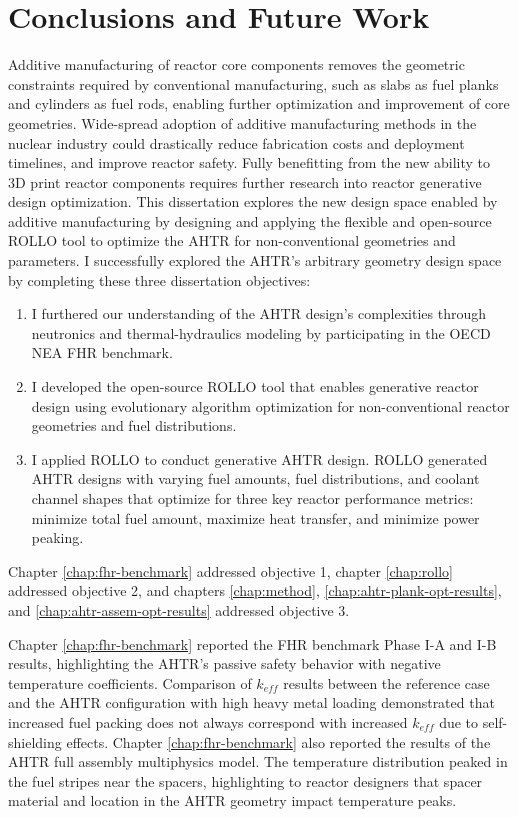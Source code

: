 \chapter{Conclusions and Future Work}
\glsresetall
\label{chap:concl}

Additive manufacturing of reactor core components removes the geometric constraints
required by conventional manufacturing, such as slabs as fuel planks and cylinders 
as fuel rods, enabling further optimization and improvement of core geometries. 
Wide-spread adoption of additive manufacturing methods in the nuclear industry
could drastically reduce fabrication costs and deployment timelines, and improve 
reactor safety. 
Fully benefitting from the new ability to 3D print reactor components requires further 
research into reactor generative design optimization. 
This dissertation explores the new design space enabled by additive manufacturing 
by designing and applying the flexible and open-source \gls{ROLLO} tool to optimize 
the \gls{AHTR} for non-conventional geometries and parameters. 
I successfully explored the \gls{AHTR}'s arbitrary geometry design space by completing 
these three dissertation objectives: 
\begin{enumerate}
    \item I furthered our understanding of the \gls{AHTR} design's complexities 
    through neutronics and thermal-hydraulics modeling by participating in the 
    \gls{OECD} \gls{NEA} \gls{FHR} benchmark.
    \item I developed the open-source \gls{ROLLO} tool that enables generative reactor 
    design using evolutionary algorithm optimization for non-conventional reactor 
    geometries and fuel distributions.
    \item I applied \gls{ROLLO} to conduct generative \gls{AHTR} design.
    \gls{ROLLO} generated \gls{AHTR} designs with varying fuel amounts, fuel 
    distributions, and coolant channel shapes that optimize for three key reactor 
    performance metrics: minimize total fuel amount, maximize heat transfer, and 
    minimize power peaking.
\end{enumerate}
Chapter \ref{chap:fhr-benchmark} addressed objective 1, chapter \ref{chap:rollo} 
addressed objective 2, and chapters \ref{chap:method}, \ref{chap:ahtr-plank-opt-results}, 
and \ref{chap:ahtr-assem-opt-results} addressed objective 3. 

Chapter \ref{chap:fhr-benchmark} reported the \gls{FHR} benchmark Phase I-A and I-B 
results, highlighting the \gls{AHTR}'s passive safety behavior with 
negative temperature coefficients. 
Comparison of $k_{eff}$ results between the reference case and the \gls{AHTR} 
configuration with high heavy metal loading demonstrated that increased fuel 
packing does not always correspond with increased $k_{eff}$ due to self-shielding 
effects.
Chapter \ref{chap:fhr-benchmark} also reported the results of the \gls{AHTR} full 
assembly multiphysics model. The temperature distribution peaked in the fuel stripes near 
the spacers, highlighting to reactor designers that spacer material and location in the 
\gls{AHTR} geometry impact temperature peaks.  

